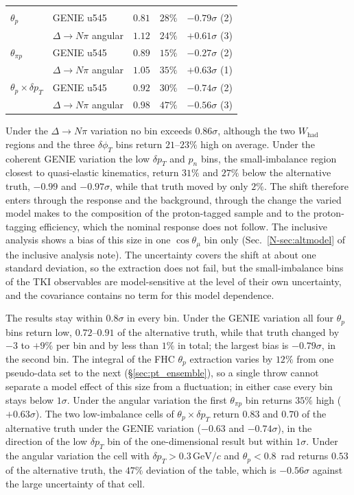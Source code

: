 \documentclass[11pt,a4paper]{article}
\newcommand{\GeVc}{\,\text{GeV}\!/c}
\newcommand{\noteref}[2]{#1~\ref{N-#2} of the inclusive analysis note}
\begin{document}
\begin{table}[H]
\begin{tabular}{llccc}
    \midrule
    \multicolumn{5}{l}{} \\
    $\theta_p$ & GENIE u545 & $0.81$ & $28\%$ & $-0.79\sigma$ (2) \\
                     & $\Delta\to N\pi$ angular & $1.12$ & $24\%$ & $+0.61\sigma$ (3) \\
    $\theta_{\pi p}$ & GENIE u545 & $0.89$ & $15\%$ & $-0.27\sigma$ (2) \\
                     & $\Delta\to N\pi$ angular & $1.05$ & $35\%$ & $+0.63\sigma$ (1) \\
    $\theta_p\times\delta p_T$ & GENIE u545 & $0.92$ & $30\%$ & $-0.74\sigma$ (2) \\
                     & $\Delta\to N\pi$ angular & $0.98$ & $47\%$ & $-0.56\sigma$ (3) \\
    \bottomrule
  \end{tabular}
\end{table}

Under the $\Delta\to N\pi$ variation no bin exceeds $0.86\sigma$, although the two $W_\mathrm{had}$
regions and the three $\delta\phi_T$ bins return $21$--$23\%$ high on average. Under the coherent GENIE
variation the low $\delta p_T$ and $p_n$ bins, the small-imbalance region closest to quasi-elastic
kinematics, return $31\%$ and $27\%$ below the alternative truth, $-0.99$ and $-0.97\sigma$, while that
truth moved by only $2\%$. The shift therefore enters through the response and the background, through the change
the varied model makes to the composition of the proton-tagged sample and to the proton-tagging
efficiency, which the nominal response does not follow. The inclusive analysis shows a bias of this
size in one $\cos\theta_\mu$ bin only (\noteref{Sec.}{sec:altmodel}). The uncertainty covers the shift at about
one standard deviation, so the extraction does not fail, but the small-imbalance bins of the TKI
observables are model-sensitive at the level of their own uncertainty, and the covariance contains no
term for this model dependence.

The  results stay within $0.8\sigma$ in every bin. Under the GENIE variation all
four $\theta_p$ bins return low, $0.72$--$0.91$ of the alternative truth, while that truth changed by
$-3$ to $+9\%$ per bin and by less than $1\%$ in total; the largest bias is $-0.79\sigma$, in the second bin. The integral of the FHC $\theta_p$
extraction varies by $12\%$ from one pseudo-data set to the next (\S\ref{sec:pt_ensemble}), so a single
throw cannot separate a model effect of this size from a fluctuation; in either case every bin stays
below $1\sigma$. Under the angular variation the first $\theta_{\pi p}$ bin returns $35\%$ high
($+0.63\sigma$). The two low-imbalance cells of $\theta_p\times\delta p_T$ return $0.83$ and $0.70$ of the
alternative truth under the GENIE variation ($-0.63$ and $-0.74\sigma$), in the direction of the low
$\delta p_T$ bin of the one-dimensional result but within $1\sigma$. Under the angular variation the cell
with $\delta p_T>0.3\GeVc$ and $\theta_p<0.8$~rad returns $0.53$ of the alternative truth, the $47\%$
deviation of the table, which is $-0.56\sigma$ against the large uncertainty of that cell.
\end{document}
